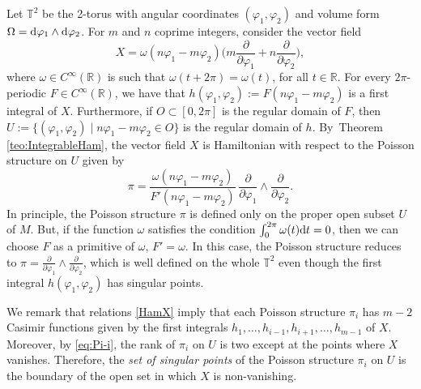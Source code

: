 \documentclass[10pt,a4paper]{amsart}
\newcommand{\dd}{{\rm d}}
\numberwithin{equation}{section}
\begin{document}
\begin{Example}\label{ex:TorusIntegrable}
Let $\mathbb{T}^2$ be the 2-torus with angular coordinates $(\varphi_1,\varphi_2)$ and volume form \mbox{$\Omega= \dd \varphi_1 \wedge \dd \varphi_2$}. For $m$ and $n$ coprime integers, consider the vector field
 \begin{equation*}
 X = \omega(n\varphi_1-m\varphi_2) \bigg( m\frac{\partial}{\partial \varphi_1} + n\frac{\partial}{\partial \varphi_2} \bigg),
 \end{equation*}
where $\omega \in C^\infty(\mathbb{R})$ is such that $\omega(t+2\pi) = \omega(t)$, for all $t\in \mathbb{R}$. For every $2\pi$-periodic $F \in C^\infty(\mathbb{R})$, we have that $h(\varphi_1,\varphi_2):= F(n\varphi_1-m\varphi_2)$ is a first integral of $X$. Furthermore, if $O \subset [0,2\pi]$ is the regular domain of $F$, then $U:=\{(\varphi_1,\varphi_2) \mid n\varphi_1-m\varphi_2\in O\}$ is the regular domain of $h$. By~Theorem \ref{teo:IntegrableHam}, the vector field $X$ is Hamiltonian with respect to the Poisson structure on $U$ given by
 \begin{equation*}
 \pi = \frac{\omega(n\varphi_1-m\varphi_2)}{F'(n\varphi_1-m\varphi_2)}\,\frac{\partial}{\partial \varphi_1}\wedge \frac{\partial}{\partial \varphi_2}.
 \end{equation*}
In principle, the Poisson structure $\pi$ is defined only on the proper open subset $U$ of $M$. But, if the function $\omega$ satisfies the condition $\int_0^{2\pi}\omega(t)\dd t=0$, then we can choose $F$ as a primitive of $\omega$, $F'=\omega$. In this case, the Poisson structure reduces to $\pi = \frac{\partial}{\partial \varphi_1}\wedge \frac{\partial}{\partial \varphi_2}$, which is well defined on the whole $\mathbb{T}^2$ even though the first integral $h(\varphi_1,\varphi_2)$ has singular points.
\end{Example}

We remark that relations \eqref{HamX} imply that each Poisson structure $\pi_i$ has $m-2$ Casimir functions given by the first integrals $h_1,\dots, h_{i-1},h_{i+1},\dots, h_{m-1}$ of $X$. Moreover, by \eqref{eq:Pi-i}, the rank of $\pi_i$ on $U$ is two except at the points where $X$ vanishes. Therefore, the \emph{set of singular points} of the Poisson structure $\pi_i$ on $U$ is the boundary of the open set in which $X$ is non-vanishing.
\end{document}
